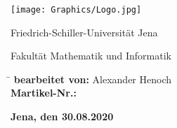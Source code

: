 \begin{titlepage}
    
    \centering 
    \texttt{[image: Graphics/Logo.jpg]}
    
    \vspace{5cm}
    
    {\large Friedrich-Schiller-Universität Jena}
      
    {\large Fakultät Mathematik und Informatik}
    
    \vfill
    
    \flushleft
    
    \begin{nstabbing}
        \hspace{0.25\textwidth} \= \kill
        \textbf{bearbeitet von:} \> Alexander Henoch\\
        \textbf{Martikel-Nr.:} 
    \end{nstabbing}
    
    \vspace{2cm}
    
    \textbf{Jena, den 30.08.2020}
    
\end{titlepage}